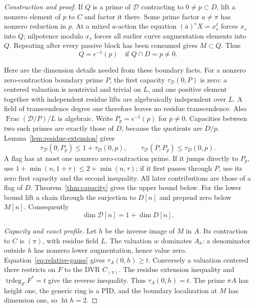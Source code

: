 \documentclass[10pt,a4paper]{amsart}
\begin{document}
\begin{proof}[Construction and proof]
If \(Q\) is a prime of \(\mathcal D\) contracting to
\(0\ne p\subset D\), lift a nonzero element of \(p\) to
\(C\) and factor it there.  Some prime factor \(a\ne\pi\)
has nonzero reduction in \(p\).  At a mixed \(a\)-action the
equation \((\bar a)^eX=x_s^\ell\) forces \(x_s\) into
\(Q\); nilpotence modulo \(x_s\) forces all earlier curve
augmentation elements into \(Q\).  Repeating after every
passive block has been consumed gives \(M\subset Q\).  Thus
\begin{equation}\label{eq:relative-boundary-primes}
Q=\epsilon^{-1}(p)\quad\text{if }Q\cap D=p\ne0.
\end{equation}

Here are the dimension details needed from these boundary facts.
For a nonzero zero-contraction boundary prime \(P\), the first
capacity \(\tau_{\mathcal D}(0,P)\) is zero: a centered
valuation is nontrivial and trivial on \(L\), and one positive
element together with independent residue lifts are algebraically
independent over \(L\).  A field of transcendence degree one
therefore leaves no residue transcendence.  Also
\(\operatorname{Frac}(\mathcal D/P)/L\) is algebraic.  Write
\(P_p=\epsilon^{-1}(p)\) for \(p\ne0\).  Capacities between
two such primes are exactly those of \(D\), because the
quotients are \(D/p\).  Lemma~\ref{lem:residue-extension} gives
\[
 \tau_{\mathcal D}(0,P_p)\le1+\tau_D(0,p),\qquad
 \tau_{\mathcal D}(P,P_p)\le\tau_D(0,p).
\]
A flag has at most one nonzero zero-contraction prime.  If it
jumps directly to \(P_p\), use
\(1+\min(n,1+\tau)\le2+\min(n,\tau)\); if it first
passes through \(P\), use its zero first capacity and the
second inequality.  All later contributions are those of a
flag of \(D\).  Theorem~\ref{thm:capacity} gives the upper
bound below.  For the lower bound lift a chain through the
surjection to \(D[n]\) and prepend zero below \(M[n]\).
Consequently
\begin{equation}\label{eq:relative-boundary-profile}
\dim\mathcal D[n]=1+\dim D[n].
\end{equation}

\smallskip\noindent\emph{Capacity and exact profile.}
Let \(h\) be the inverse image of \(M\) in \(A\).  Its
contraction to \(C\) is \((\pi)\), with residue field \(L\).
The valuation \(w\) dominates \(A_h\): a denominator outside
\(h\) has nonzero lower augmentation, hence value zero.
Equation~\eqref{eq:relative-gauss} gives \(\tau_A(0,h)\ge t\).
Conversely a valuation centered there restricts on \(F\) to
the DVR \(C_{(\pi)}\).  The residue extension inequality and
\(\operatorname{trdeg}_F F^*=t\) give the reverse inequality.
Thus \(\tau_A(0,h)=t\).  The prime \(\pi A\) has height
one, the generic ring is a PID, and the boundary localization
at \(M\) has dimension one, so \(\operatorname{ht}h=2\).


\end{proof}
\end{document}

